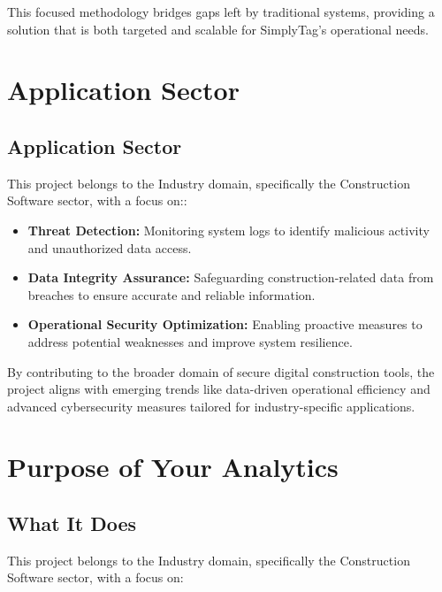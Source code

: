 This focused methodology bridges gaps left by traditional systems, providing a solution that is both targeted and scalable for SimplyTag’s operational needs.

\newpage
\chapter{Application Sector}

\section{Application Sector}

This project belongs to the Industry domain, specifically the Construction Software sector, with a focus on::

\begin{itemize}
	\item \textbf{Threat Detection:} Monitoring system logs to identify malicious activity and unauthorized data access.
	\item \textbf{Data Integrity Assurance:} Safeguarding construction-related data from breaches to ensure accurate and reliable information.
	\item \textbf{Operational Security Optimization:} Enabling proactive measures to address potential weaknesses and improve system resilience.
\end{itemize}

By contributing to the broader domain of secure digital construction tools, the project aligns with emerging trends like data-driven operational efficiency and advanced cybersecurity measures tailored for industry-specific applications.

\chapter{Purpose of Your Analytics}

\section{What It Does}

This project belongs to the Industry domain, specifically the Construction Software sector, with a focus on:

